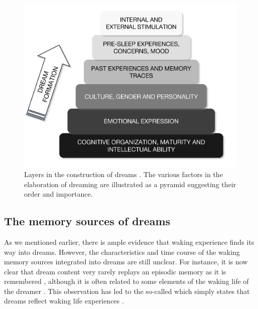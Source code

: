 \begin{figure}[htb]
	\includegraphics[width=\textwidth]{Fig/Intro/Intro_Pyramid_dream_construction/Intro_pyramid_dream.png}
	\caption[Layers in the construction of dreams]{Layers in the construction of dreams \citep{de_koninck_sleep_2012}. The various factors in the elaboration of dreaming are illustrated as a pyramid suggesting their order and importance.}
	\label{fig:intro:koninck}
\end{figure}

\subsection{The memory sources of dreams}
\label{sec:dream-content:sources:memory}

As we mentioned earlier, there is ample evidence that waking experience finds its way into dreams. However, the characteristics and time course of the waking memory sources integrated into dreams are still unclear. For instance, it is now clear that dream content very rarely replays an episodic memory as it is remembered \citep{fosse_dreaming_2003, nielsen_what_2005}, although it is often related to some elements of the waking life of the dreamer \citep{schredl_characteristics_2010, blagrove_trait_2010, ruby_experimental_2011}. This observation has led to the so-called  which simply states that dreams reflect waking life experiences \citep{schredl_continuity_2003}.

